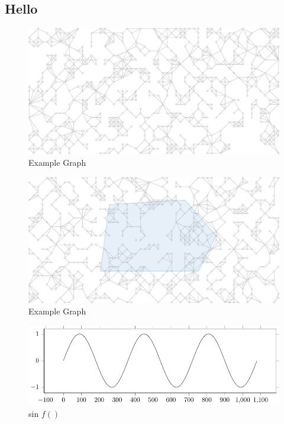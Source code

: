 \begin{appendices}
  \section{Hello}

  \begin{figure}
    \includegraphics[width=14.0cm]{inc/output.pdf}
    \caption{Example Graph}
    \label{cap:adx:graph}
  \end{figure}

  \begin{figure}
    \includegraphics[width=14.0cm]{inc/output3.pdf}
    \caption{Example Graph}
    \label{cap:adx:graph}
  \end{figure}

  \begin{figure}
    \includegraphics[width=14.0cm]{inc/plot.pdf}
    \caption{sin $f()$}
    \label{cap:adx:graph}
  \end{figure}


\end{appendices}
